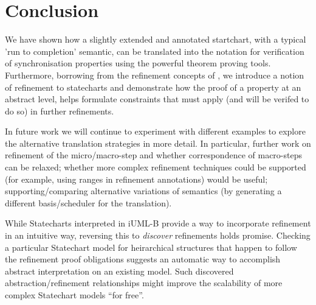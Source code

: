 
\section{Conclusion}
\label{sec:conclusion}

We have shown how a slightly extended and annotated startchart, with a typical 'run to completion' semantic, can be translated into the \EventB notation for verification of synchronisation properties using the powerful \EventB theorem proving tools.
Furthermore, borrowing from the refinement concepts of \EventB, we introduce a notion of refinement to statecharts and demonstrate how the proof of a property at an abstract level, helps formulate constraints that must apply (and will be verifed to do so) in further refinements.

In future work we will continue to experiment with different examples to explore the alternative translation strategies in more detail. 
In particular, further work on refinement of the micro/macro-step and whether correspondence of macro-steps can be relaxed; whether more complex refinement techniques could be supported (for example, using ranges in refinement annotations) would be useful; supporting/comparing alternative variations of semantics (by generating a different basis/scheduler for the translation).

While Statecharts interpreted in iUML-B provide a way to incorporate refinement in an intuitive way, reversing this to \emph{discover} refinements holds promise. 
Checking a particular Statechart model for heirarchical structures that happen to follow the refinement proof obligations suggests an automatic way to accomplish abstract interpretation on an existing model.  
Such discovered abstraction/refinement relationships might improve the scalability of more complex Statechart models ``for free''.
